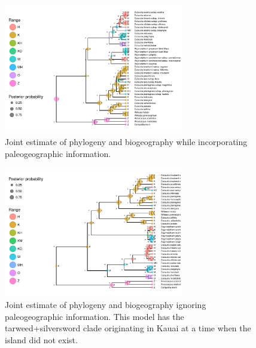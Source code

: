 \begin{figure}[!ht]
\centering
\includegraphics[width=0.7\textwidth]{figures/fig_epoch_phy_RevGadgets_ase.pdf}
\caption{Joint estimate of phylogeny and biogeography while incorporating paleogeographic information.}
\end{figure}



\begin{figure}[!ht]
\centering
\includegraphics[width=0.7\textwidth]{figures/fig_simple_phy_RevGadgets_ase.pdf}
\caption{Joint estimate of phylogeny and biogeography ignoring paleogeographic information. This model has the tarweed+silversword clade originating in Kauai at a time when the island did not exist.}
\end{figure}



\newpage
